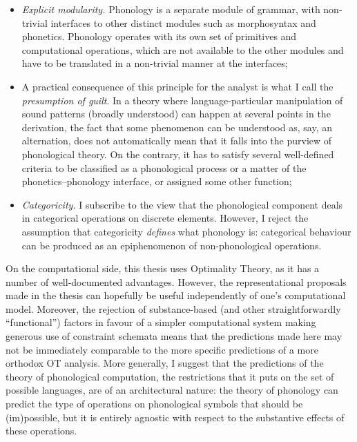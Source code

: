 \begin{itemize}
\item \emph{Explicit modularity.} Phonology is a separate module of grammar, with non-trivial interfaces to other distinct modules such as morphosyntax and phonetics. Phonology operates with its own set of primitives and computational operations, which are not available to the other modules and have to be translated in a non\hyp trivial manner at the interfaces;
\item A practical consequence of this principle for the analyst is what I call the \emph{presumption of guilt}. In a theory where language-particular manipulation of sound patterns (broadly understood) can happen at several points in the derivation, the fact that some phenomenon can be understood as, say, an alternation, does not automatically mean that it falls into the purview of phonological theory. On the contrary, it has to satisfy several well-defined criteria to be classified as a phonological process or a matter of the phonetics--phonology interface, or assigned some other function;
\item \emph{Categoricity.} I subscribe to the view that the phonological component deals in categorical operations on discrete elements. However, I reject the assumption that categoricity \emph{defines} what phonology is: categorical behaviour can be produced as an epiphenomenon of non\hyp phonological operations.
\end{itemize}


On the computational side, this thesis uses Optimality Theory, as it has a number of well-documented advantages. However, the representational proposals made in the thesis can hopefully be useful independently of one's computational model. Moreover, the rejection of substance-based (and other straightforwardly \enquote{functional}) factors in favour of a simpler computational system making generous use of constraint schemata means that the predictions made here may not be immediately comparable to the more specific predictions of a more orthodox OT analysis. More generally, I suggest that the predictions of the theory of phonological computation, \ie the restrictions that it puts on the set of possible languages, are of an architectural nature: the theory of phonology can predict the type of operations on phonological symbols that should be (im)possible, but it is entirely agnostic with respect to the substantive effects of these operations.


